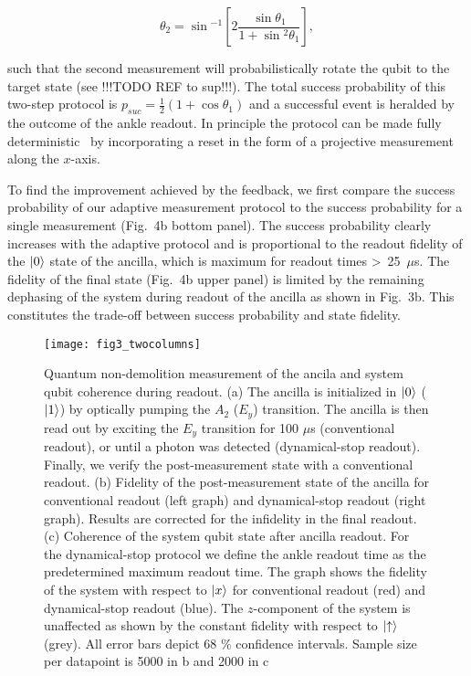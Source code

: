 \begin{equation}
\theta_2 = \sin{^{-1}\left[2 \frac{\sin{\theta_1}}{1 + \sin{^2 \theta_1}}\right]},
\end{equation}

such that the second measurement will probabilistically rotate the qubit to the target state (see !!!TODO REF to sup!!!). The total success probability of this two-step protocol is  $p_{suc} = \frac{1}{2}(1 + \cos{\theta_1})$ and a successful event is heralded by the outcome of the ankle readout. In principle the protocol can be made fully deterministic~\cite{Ashhab_PhysRevA_2010} by incorporating a reset in the form of a projective measurement along the $x$-axis.

To find the improvement achieved by the feedback, we first compare the success probability of our adaptive measurement protocol to the success probability for a single measurement (Fig.~4b bottom panel). The success probability clearly increases with the adaptive protocol and is proportional to the readout fidelity of the $\left|0\right\rangle$ state of the ancilla, which is maximum for readout times  \textgreater~25~$\mu$s. The fidelity of the final state (Fig.~4b upper panel) is limited by the remaining dephasing of the system during readout of the ancilla as shown in Fig.~3b. This constitutes the trade-off between success probability and state fidelity. 

\begin{figure*}
	\texttt{[image: fig3\_twocolumns]}
	\caption{\label{fig3} Quantum non-demolition measurement of the ancila and system qubit coherence during readout. (a) The ancilla is initialized in $\left|0\right\rangle$ ($\left|1\right\rangle$) by optically pumping the $A_2$ ($E_y$) transition. The ancilla is then read out by exciting the $E_y$ transition for 100 $\mu$s (conventional readout), or until a photon was detected (dynamical-stop readout). Finally, we verify the post-measurement state with a conventional readout. (b) Fidelity of the post-measurement state of the ancilla for conventional readout (left graph) and dynamical-stop readout (right graph). Results are corrected for the infidelity in the final readout.  (c) Coherence of the system qubit state after ancilla readout. For the dynamical-stop protocol we define the ankle readout time as the predetermined maximum readout time. The graph shows the fidelity of the system with respect to $\left|x\right\rangle$ for conventional readout (red) and dynamical-stop readout (blue). The $z$-component of the system is unaffected as shown by the constant fidelity with respect to $\left|\uparrow\right\rangle$ (grey). All error bars depict 68 $\%$ confidence intervals. Sample size per datapoint is 5000 in b and 2000 in c }
\end{figure*}

